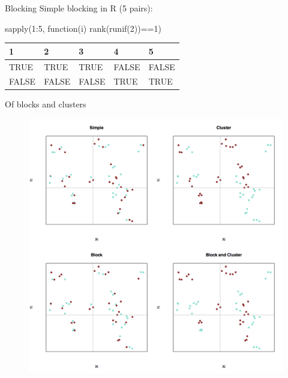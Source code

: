 \documentclass[
  11pt,
  ignorenonframetext,
]{beamer}
\newenvironment{Shaded}{\begin{snugshade}}{\end{snugshade}}
\newcommand{\ControlFlowTok}[1]{\textcolor[rgb]{0.00,0.23,0.31}{#1}}
\newcommand{\DecValTok}[1]{\textcolor[rgb]{0.68,0.00,0.00}{#1}}
\newcommand{\FunctionTok}[1]{\textcolor[rgb]{0.28,0.35,0.67}{#1}}
\newcommand{\NormalTok}[1]{\textcolor[rgb]{0.00,0.23,0.31}{#1}}
\newcommand{\SpecialCharTok}[1]{\textcolor[rgb]{0.37,0.37,0.37}{#1}}
\begin{document}
\begin{frame}[fragile]{Blocking}
\protect\hypertarget{blocking-1}{}
Simple blocking in R (5 pairs):

\begin{Shaded}
\begin{Highlighting}[]
\FunctionTok{sapply}\NormalTok{(}\DecValTok{1}\SpecialCharTok{:}\DecValTok{5}\NormalTok{, }\ControlFlowTok{function}\NormalTok{(i) }\FunctionTok{rank}\NormalTok{(}\FunctionTok{runif}\NormalTok{(}\DecValTok{2}\NormalTok{))}\SpecialCharTok{==}\DecValTok{1}\NormalTok{)}
\end{Highlighting}
\end{Shaded}

\begin{tabular}{l|l|l|l|l}
\hline
1 & 2 & 3 & 4 & 5\\
\hline
TRUE & TRUE & TRUE & FALSE & FALSE\\
\hline
FALSE & FALSE & FALSE & TRUE & TRUE\\
\hline
\end{tabular}
\end{frame}

\begin{frame}{Of blocks and clusters}
\protect\hypertarget{of-blocks-and-clusters}{}
\begin{figure}
\centering
\includegraphics[width=0.6\linewidth]{figs/bf}
\label{fig:bf}
\end{figure}
\end{frame}
\end{document}
